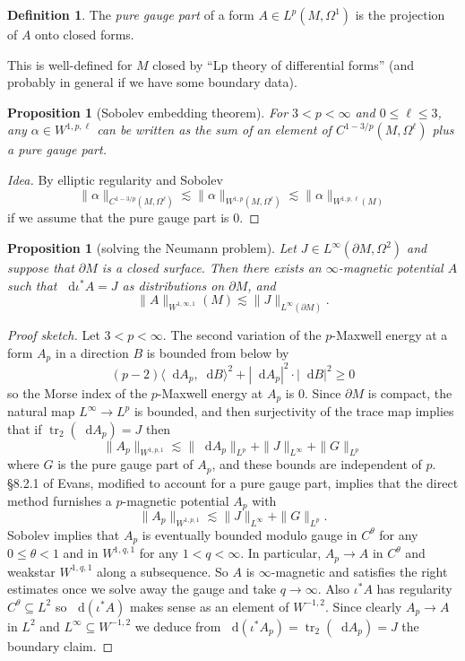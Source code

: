 \documentclass[reqno,11pt]{amsart}
\newcommand*\dif{\mathop{}\!\mathrm{d}}
\DeclareMathOperator{\tr}{tr}
\newcommand{\dfn}[1]{\emph{#1}\index{#1}}
\newtheorem{proposition}[theorem]{Proposition}
\theoremstyle{definition}
\newtheorem{definition}[theorem]{Definition}
\numberwithin{equation}{section}
\begin{document}
\begin{definition}
The \dfn{pure gauge part} of a form $A \in L^p(M, \Omega^1)$ is the projection of $A$ onto closed forms.
\end{definition}

This is well-defined for $M$ closed by ``Lp theory of differential forms'' (and probably in general if we have some boundary data).

\begin{proposition}[Sobolev embedding theorem]
For $3 < p < \infty$ and $0 \leq \ell \leq 3$, any $\alpha \in W^{1, p, \ell}$ can be written as the sum of an element of $C^{1 - 3/p}(M, \Omega^\ell)$ plus a pure gauge part.
\end{proposition}
\begin{proof}[Idea]
By elliptic regularity and Sobolev 
$$\|\alpha\|_{C^{1 - 3/p}(M, \Omega^\ell)} \lesssim \|\alpha\|_{W^{1, p}(M, \Omega^\ell)} \lesssim \|\alpha\|_{W^{1, p, \ell}(M)}$$
if we assume that the pure gauge part is $0$.
\end{proof}

\begin{proposition}[solving the Neumann problem]
Let $J \in L^\infty(\partial M, \Omega^2)$ and suppose that $\partial M$ is a closed surface.
Then there exists an $\infty$-magnetic potential $A$ such that $\dif \iota^* A = J$ as distributions on $\partial M$, and
$$\|A\|_{W^{1, \infty, 1}}(M) \lesssim \|J\|_{L^\infty(\partial M)}.$$
\end{proposition}
\begin{proof}[Proof sketch]
Let $3 < p < \infty$. The second variation of the $p$-Maxwell energy at a form $A_p$ in a direction $B$ is bounded from below by
$$(p - 2) \langle \dif A_p, \dif B\rangle^2 + |\dif A_p|^2 \cdot |\dif B|^2 \geq 0$$
so the Morse index of the $p$-Maxwell energy at $A_p$ is $0$.
Since $\partial M$ is compact, the natural map $L^\infty \to L^p$ is bounded, and then surjectivity of the trace map implies that if $\tr_2(\dif A_p) = J$ then
$$\|A_p\|_{W^{1, p, 1}} \lesssim \|\dif A_p\|_{L^p} + \|J\|_{L^\infty} + \|G\|_{L^p}$$
where $G$ is the pure gauge part of $A_p$, and these bounds are independent of $p$.
\S8.2.1 of Evans, modified to account for a pure gauge part, implies that the direct method furnishes a $p$-magnetic potential $A_p$ with
$$\|A_p\|_{W^{1, p, 1}} \lesssim \|J\|_{L^\infty} + \|G\|_{L^p}.$$
Sobolev implies that $A_p$ is eventually bounded modulo gauge in $C^\theta$ for any $0 \leq \theta < 1$ and in $W^{1, q, 1}$ for any $1 < q < \infty$.
In particular, $A_p \to A$ in $C^\theta$ and weakstar $W^{1, q, 1}$ along a subsequence.
So $A$ is $\infty$-magnetic and satisfies the right estimates once we solve away the gauge and take $q \to \infty$.
Also $\iota^* A$ has regularity $C^\theta \subseteq L^2$ so $\dif (\iota^* A)$ makes sense as an element of $W^{-1, 2}$.
Since clearly $A_p \to A$ in $L^2$ and $L^\infty \subseteq W^{-1, 2}$ we deduce from $\dif(\iota^* A_p) = \tr_2(\dif A_p) = J$ the boundary claim.
\end{proof}
\end{document}
